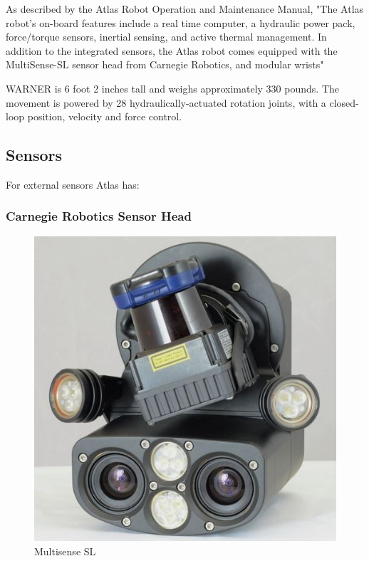 \documentclass[12pt]{report}
\begin{document}
As described by the Atlas Robot Operation and Maintenance Manual, "The Atlas robot’s on-board features include a real time computer, a hydraulic power pack, force/torque sensors, inertial sensing, and active thermal management. In addition to the integrated sensors, the Atlas robot comes equipped with the MultiSense-SL sensor head from Carnegie Robotics, and modular wrists"		

WARNER is 6 foot 2 inches tall and weighs approximately 330 pounds. The movement is powered by 28 hydraulically-actuated rotation joints, with a closed-loop position, velocity and force control. 

\subsection{Sensors}

For external sensors Atlas has:

\subsubsection{Carnegie Robotics Sensor Head}
\begin{figure}
  \begin{center}
    \includegraphics[scale=0.25]{images/sensorhead.jpg}
  \end{center}
  \caption{Multisense SL}
\end{figure}
\end{document}
